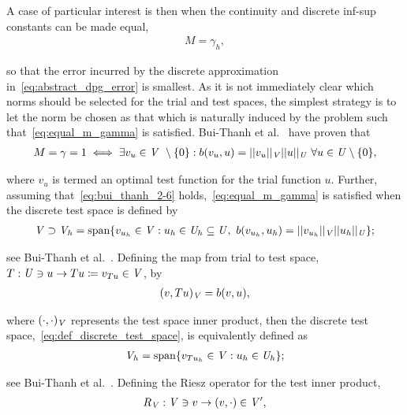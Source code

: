 A case of particular interest is then when the continuity and discrete inf-sup constants can be made equal,
\begin{align} \label{eq:equal_m_gamma}
M = \gamma_h,
\end{align}

so that the error incurred by the discrete approximation in~\eqref{eq:abstract_dpg_error} is smallest. As it is not
immediately clear which norms should be selected for the trial and test spaces, the simplest strategy is to let the norm
be chosen as that which is naturally induced by the problem such that~\eqref{eq:equal_m_gamma} is satisfied. Bui-Thanh
et al.~\cite[Theorem ]{BuiThanh2013} have proven that
\begin{align} \label{eq:bui_thanh_2-6}
M = \gamma = 1
\iff
\exists v_u \in \mathit{{{V}}}\ \setminus \{0\} :
b(v_u,u) = ||v_u||_{\mathit{{{V}}}} ||u||_{\mathit{{{U}}}}\ \forall u \in \mathit{{{U}}} \setminus \{0\},
\end{align}

where $v_u$ is termed an optimal test function for the trial function $u$. Further, assuming
that~\eqref{eq:bui_thanh_2-6} holds,~\eqref{eq:equal_m_gamma} is satisfied when the discrete test space is defined by
\begin{align} \label{eq:def_discrete_test_space}
\mathit{{{V}}} \supset \mathit{{{V}}}_h 
= {\text{span} \{ v_{u_h} \in \mathit{{{V}}} : u_h \in \mathit{{{U}}}_h \subseteq \mathit{{{U}}},\ b(v_{u_h},u_h) }
= ||v_{u_h}||_{\mathit{{{V}}}} ||u_h||_{\mathit{{{U}}}} \};
\end{align}

see Bui-Thanh et al.~\cite[Lemma ]{BuiThanh2013}. Defining the map from trial to test space, $T :
\mathit{{{U}}} \ni u \rightarrow Tu \coloneqq v_{Tu} \in \mathit{{{V}}} $, by
\begin{align}
(v,Tu)_{\mathit{{{V}}}} = b(v,u),
\end{align}

where $(\cdot,\cdot)_{\mathit{{{V}}}}$ represents the test space inner product, then the discrete test
space,~\eqref{eq:def_discrete_test_space}, is equivalently defined as
\begin{align} \label{eq:def_discrete_test_space_alt}
\mathit{{{V}}}_h = {\text{span} \{ v_{T u_h} \in \mathit{{{V}}} : u_h \in \mathit{{{U}}}_h \} };
\end{align}

see Bui-Thanh et al.~\cite[Theorem ]{BuiThanh2013}. Defining the Riesz operator for the test inner
product,
\begin{align}
R_{\mathit{{{V}}}} : \mathit{{{V}}} \ni v \rightarrow (v,\cdot) \in \mathit{{{V}}}',
\end{align}

